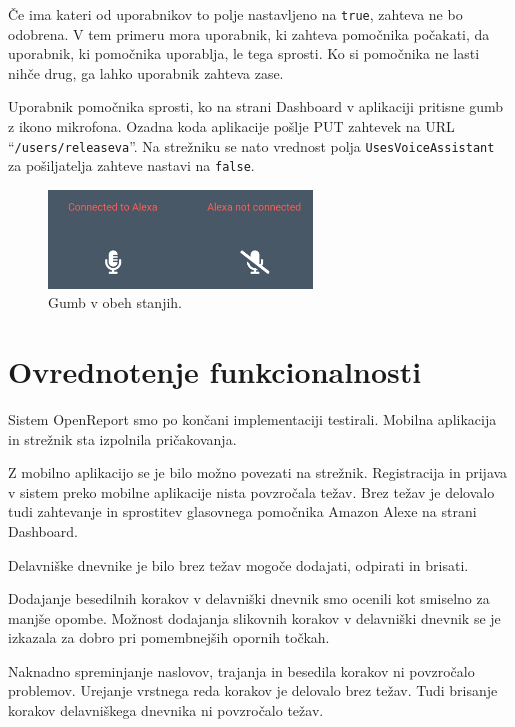\documentclass[a4paper, 12pt]{book}
\begin{document}
Če ima kateri od uporabnikov to polje nastavljeno na \texttt{true}, zahteva ne bo odobrena.
V tem primeru mora uporabnik, ki zahteva pomočnika počakati, da uporabnik, ki pomočnika uporablja, le tega sprosti.
Ko si pomočnika ne lasti nihče drug, ga lahko uporabnik zahteva zase.

Uporabnik pomočnika sprosti, ko na strani Dashboard v aplikaciji pritisne gumb z ikono mikrofona.
Ozadna koda aplikacije pošlje PUT zahtevek na URL \enquote{\texttt{/users/releaseva}}.
Na strežniku se nato vrednost polja \texttt{UsesVoiceAssistant} za pošiljatelja zahteve nastavi na \texttt{false}.


\begin{figure}[H]
\begin{center}
\includegraphics[width=7cm]{app_alexa_yesno}
\end{center}
	\caption{Gumb v obeh stanjih.}
\label{app_alexa_yesno}
\end{figure}




\chapter{Ovrednotenje funkcionalnosti}

Sistem OpenReport smo po končani implementaciji testirali. 
Mobilna aplikacija in strežnik sta izpolnila pričakovanja.

Z mobilno aplikacijo se je bilo možno povezati na strežnik.
Registracija in prijava v sistem preko mobilne aplikacije nista povzročala težav.
Brez težav je delovalo tudi zahtevanje in sprostitev glasovnega pomočnika Amazon Alexe na strani Dashboard.

Delavniške dnevnike je bilo brez težav mogoče dodajati, odpirati in brisati.

Dodajanje besedilnih korakov v delavniški dnevnik smo ocenili kot smiselno za manjše opombe.
Možnost dodajanja slikovnih korakov v delavniški dnevnik se je izkazala za dobro pri pomembnejših opornih točkah.

Naknadno spreminjanje naslovov, trajanja in besedila korakov ni povzročalo problemov.
Urejanje vrstnega reda korakov je delovalo brez težav.
Tudi brisanje korakov delavniškega dnevnika ni povzročalo težav.
\end{document}
